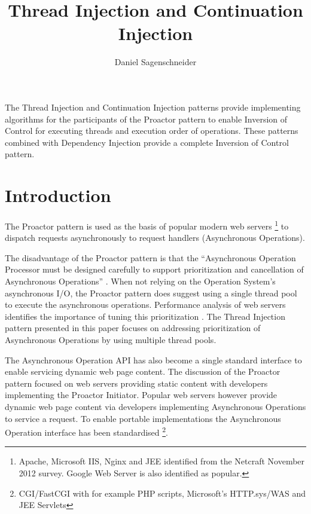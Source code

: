 \documentclass{article}
\begin{document}
\title{Thread Injection and Continuation Injection}
\author{Daniel Sagenschneider}
\date{}
\maketitle

\abstract{}
The Thread Injection and Continuation Injection patterns provide implementing
algorithms for the participants of the Proactor pattern to enable Inversion of
Control for executing threads and execution order of operations.  These patterns
combined with Dependency Injection provide a complete Inversion of Control
pattern.

\section{Introduction}

The Proactor pattern \cite{proactor} is used as the basis of popular modern web
servers \footnote{Apache, Microsoft IIS, Nginx and JEE identified from the
Netcraft November 2012 survey.  Google Web Server is also identified as
popular.} to dispatch requests asynchronously to request handlers (Asynchronous
Operations).

The disadvantage of the Proactor pattern is that the ``Asynchronous Operation
Processor must be designed carefully to support prioritization and cancellation
of Asynchronous Operations'' \cite{proactor}.  When not relying on the Operation
System's asynchronous I/O, the Proactor pattern does suggest using a single
thread pool to execute the asynchronous operations.  Performance analysis of web
servers identifies the importance of tuning this prioritization
\cite{tuning-important,low-server-footprint,tuning-os-important}.  The Thread
Injection pattern presented in this paper focuses on addressing prioritization
of Asynchronous Operations by using multiple thread pools.

The Asynchronous Operation API has also become a single standard interface to
enable servicing dynamic web page content.  The discussion of the Proactor
pattern focused on web servers providing static content with developers
implementing the Proactor Initiator.  Popular web servers however provide
dynamic web page content via developers implementing Asynchronous Operations to
service a request.  To enable portable implementations the Asynchronous
Operation interface has been standardised \footnote{CGI/FastCGI with for
example PHP scripts, Microsoft's HTTP.sys/WAS and JEE Servlets}.
\end{document}
